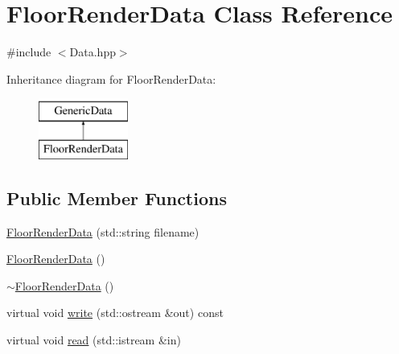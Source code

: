 \hypertarget{class_floor_render_data}{\section{Floor\-Render\-Data Class Reference}
\label{class_floor_render_data}
}


{\ttfamily \#include $<$Data.\-hpp$>$}

Inheritance diagram for Floor\-Render\-Data\-:\begin{figure}[H]
\begin{center}
\leavevmode
\includegraphics[height=2.000000cm]{class_floor_render_data}
\end{center}
\end{figure}
\subsection*{Public Member Functions}
\begin{DoxyCompactItemize}
\item 
\hyperlink{class_floor_render_data_ad40ad1c8a5c3cbf74cf154c4075e675a}{Floor\-Render\-Data} (std\-::string filename)
\item 
\hyperlink{class_floor_render_data_a784aafb1ab4f32823b0f6cc439e90bbb}{Floor\-Render\-Data} ()
\item 
\hyperlink{class_floor_render_data_aeaedcca3caa68ac4c23f5eb653b2c839}{$\sim$\-Floor\-Render\-Data} ()
\item 
virtual void \hyperlink{class_floor_render_data_a0303743e7939b4cf8bd9c155b79c07f3}{write} (std\-::ostream \&out) const 
\item 
virtual void \hyperlink{class_floor_render_data_a781daa3645a4924dc9f5df99a0c28b67}{read} (std\-::istream \&in)
\end{DoxyCompactItemize}
